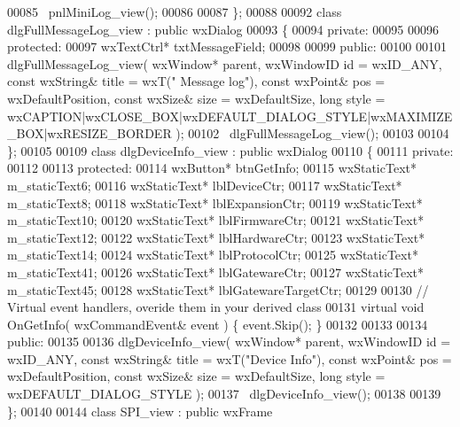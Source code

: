 \begin{DoxyCode}
00085         ~pnlMiniLog_view();
00086     
00087 \};
00088 
00092 \textcolor{keyword}{class }dlgFullMessageLog_view : \textcolor{keyword}{public} wxDialog 
00093 \{
00094     \textcolor{keyword}{private}:
00095     
00096     \textcolor{keyword}{protected}:
00097         wxTextCtrl* txtMessageField;
00098     
00099     \textcolor{keyword}{public}:
00100         
00101         dlgFullMessageLog_view( wxWindow* parent, wxWindowID \textcolor{keywordtype}{id} = wxID\_ANY, \textcolor{keyword}{const} wxString& title = wxT(\textcolor{stringliteral}{"
      Message log"}), \textcolor{keyword}{const} wxPoint& pos = wxDefaultPosition, \textcolor{keyword}{const} wxSize& size = wxDefaultSize, \textcolor{keywordtype}{long} style = 
      wxCAPTION|wxCLOSE\_BOX|wxDEFAULT\_DIALOG\_STYLE|wxMAXIMIZE\_BOX|wxRESIZE\_BORDER ); 
00102         ~dlgFullMessageLog_view();
00103     
00104 \};
00105 
00109 \textcolor{keyword}{class }dlgDeviceInfo_view : \textcolor{keyword}{public} wxDialog 
00110 \{
00111     \textcolor{keyword}{private}:
00112     
00113     \textcolor{keyword}{protected}:
00114         wxButton* btnGetInfo;
00115         wxStaticText* m_staticText6;
00116         wxStaticText* lblDeviceCtr;
00117         wxStaticText* m_staticText8;
00118         wxStaticText* lblExpansionCtr;
00119         wxStaticText* m_staticText10;
00120         wxStaticText* lblFirmwareCtr;
00121         wxStaticText* m_staticText12;
00122         wxStaticText* lblHardwareCtr;
00123         wxStaticText* m_staticText14;
00124         wxStaticText* lblProtocolCtr;
00125         wxStaticText* m_staticText41;
00126         wxStaticText* lblGatewareCtr;
00127         wxStaticText* m_staticText45;
00128         wxStaticText* lblGatewareTargetCtr;
00129         
00130         \textcolor{comment}{// Virtual event handlers, overide them in your derived class}
00131         \textcolor{keyword}{virtual} \textcolor{keywordtype}{void} OnGetInfo( wxCommandEvent& event ) \{ \textcolor{keyword}{event}.Skip(); \}
00132         
00133     
00134     \textcolor{keyword}{public}:
00135         
00136         dlgDeviceInfo_view( wxWindow* parent, wxWindowID \textcolor{keywordtype}{id} = wxID\_ANY, \textcolor{keyword}{const} wxString& title = wxT(\textcolor{stringliteral}{"Device
       Info"}), \textcolor{keyword}{const} wxPoint& pos = wxDefaultPosition, \textcolor{keyword}{const} wxSize& size = wxDefaultSize, \textcolor{keywordtype}{long} style = 
      wxDEFAULT\_DIALOG\_STYLE ); 
00137         ~dlgDeviceInfo_view();
00138     
00139 \};
00140 
00144 \textcolor{keyword}{class }SPI_view : \textcolor{keyword}{public} wxFrame 

\end{DoxyCode}
